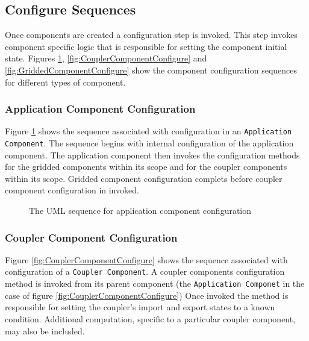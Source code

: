 \subsection{Configure Sequences}
Once components are created a configuration step is invoked. This step
invokes component specific logic that is responsible for setting the component
initial state. Figures \ref{fig:ApplicationComponentConfigure}, 
\ref{fig:CouplerComponentConfigure} and 
\ref{fig:GriddedComponentConfigure} show the component
configuration sequences for different types of component.

\subsubsection{Application Component Configuration}
Figure \ref{fig:ApplicationComponentConfigure} shows the sequence associated 
with configuration in an {\tt Application Component}. The sequence begins 
with internal configuration of the application component. The application
component then invokes the configuration methods for the gridded components
within its scope and for the coupler components within its scope.
Gridded component configuration complets before coupler component
configuration in invoked.

\begin{figure}
\caption[{Application Component Configuration}]
{The UML sequence for application component configuration}
\label{fig:ApplicationComponentConfigure}
\end{figure}

\subsubsection{Coupler Component Configuration}
Figure \ref{fig:CouplerComponentConfigure} shows the sequence associated 
with configuration of a {\tt Coupler Component}. A coupler components
configuration method is invoked from its parent
component (the {\tt Application Componet} in the case of
figure \ref{fig:CouplerComponentConfigure}) Once invoked the method
is responsible for setting the coupler's import and export states 
to a known condition. Additional computation, specific to a particular
coupler component, may also be included.


